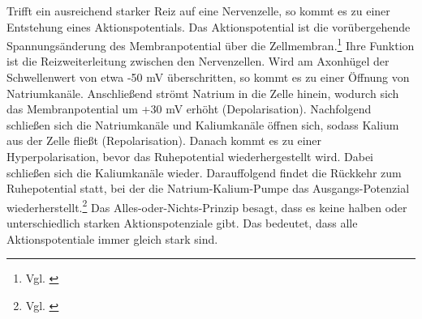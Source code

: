 Trifft ein ausreichend starker Reiz auf eine Nervenzelle, so kommt es zu einer Entstehung eines Aktionspotentials. Das Aktionspotential ist die vorübergehende Spannungsänderung des Membranpotential über die Zellmembran.\footnote{Vgl. \cite{studyflix_aktionspotential}} Ihre Funktion ist die Reizweiterleitung zwischen den Nervenzellen. Wird am Axonhügel der Schwellenwert von etwa -50 mV überschritten, so kommt es zu einer Öffnung von Natriumkanäle. Anschließend strömt Natrium in die Zelle hinein, wodurch sich das Membranpotential um +30 mV erhöht (Depolarisation). Nachfolgend schließen sich die Natriumkanäle und Kaliumkanäle öffnen sich, sodass Kalium aus der Zelle fließt (Repolarisation). Danach kommt es zu einer Hyperpolarisation, bevor das Ruhepotential wiederhergestellt wird. Dabei schließen sich die Kaliumkanäle wieder. Darauffolgend findet die Rückkehr zum Ruhepotential statt, bei der die Natrium-Kalium-Pumpe das Ausgangs-Potenzial wiederherstellt.\footnote{Vgl. \cite{kenhub_aktionspotential}} Das Alles-oder-Nichts-Prinzip besagt, dass es keine halben oder unterschiedlich starken Aktionspotenziale gibt. Das bedeutet, dass alle Aktionspotentiale immer gleich stark sind.

